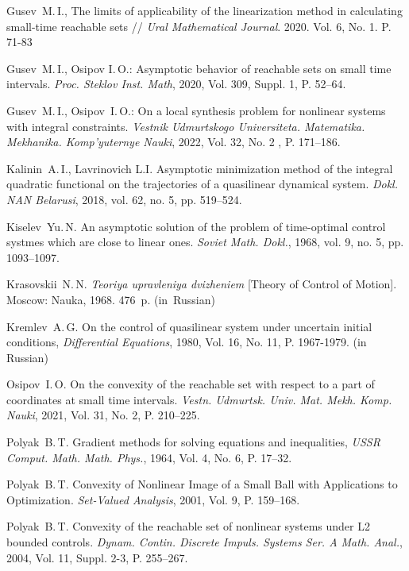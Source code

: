 \documentclass[../main.tex]{subfiles}
\begin{document}
\begin{thebibliography}{99}
Gusev~M.\,I., The limits of applicability of the linearization method in calculating small-time reachable sets // \emph{Ural Mathematical Journal}. 2020. Vol. 6, No. 1. P. 71-83

Gusev~M.\,I., Osipov I.\,O.: Asymptotic behavior of reachable sets on small time intervals. \emph{Proc. Steklov Inst. Math}, 2020, Vol. 309, Suppl. 1, P. 52--64.  

Gusev~M.\,I., Osipov~I.\,O.: On a local synthesis problem for nonlinear systems with integral constraints. \emph{Vestnik Udmurtskogo Universiteta. Matematika. Mekhanika. Komp’yuternye Nauki}, 2022, Vol. 32, No. 2 , P. 171–186.

Kalinin~A.\,I., Lavrinovich L.I. Asymptotic minimization method of the integral quadratic functional on
the trajectories of a quasilinear dynamical system. \emph{Dokl. NAN Belarusi}, 2018, vol. 62, no. 5, pp. 519–524.

Kiselev~Yu.\,N. An asymptotic solution of the problem of time-optimal control systmes which are close to
linear ones. \emph{Soviet Math. Dokl.}, 1968, vol. 9, no. 5, pp. 1093–1097.

{Krasovskii~N.\,N.} \emph{Teoriya upravleniya dvizheniem} [Theory of Control of Motion]. Moscow: Nauka, 1968. 476~p. (in~Russian)

Kremlev~A.\,G. On the control of quasilinear system under uncertain initial conditions, \emph{Differential Equations}, 1980, Vol. 16, No. 11, P. 1967-1979. (in Russian)

Osipov~I.\,O. On the convexity of the reachable set with respect to a part of coordinates at small time intervals. \emph{Vestn. Udmurtsk. Univ. Mat. Mekh. Komp. Nauki}, 2021,  Vol. 31, No. 2, P. 210--225.

Polyak~B.\,T. Gradient methods for solving equations and inequalities, \emph{USSR Comput. Math. Math.
	Phys.}, 1964, Vol. 4, No. 6, P. 17–32.

Polyak~B.\,T. Convexity of Nonlinear Image of a Small Ball with Applications to Optimization. \emph{Set-Valued Analysis}, 2001, Vol. 9, P. 159–168.

Polyak~B.\,T. Convexity of the reachable set of nonlinear systems under L2 bounded controls. \emph{Dynam. Contin. Discrete Impuls. Systems Ser. A Math. Anal.}, 2004, Vol. 11, Suppl. 2-3,  P. 255–267.


\end{thebibliography}
\end{document}
